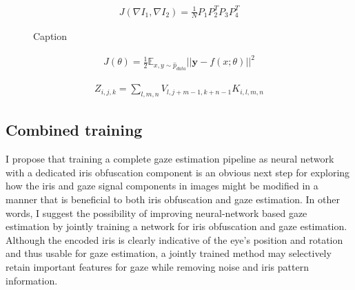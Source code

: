 \begin{align}
    J(\nabla I_1, \nabla I_2) = \frac{1}{N}P_1P_2^TP_3P_4^T
\end{align}

\begin{figure}
    \centering
    \caption{Caption}
    \label{fig:my_label}
\end{figure}


\begin{align}
    J(\theta) = \frac{1}{2}\mathbb{E}_{x,y\sim \hat{p}_{data}} ||\mathbf{y}-f(x;\theta)||^2
\end{align}

\begin{align}
    Z_{i,j,k} = \sum_{l,m,n} V_{l,j+m-1, k+n-1}K_{i,l,m,n}
\end{align}



\subsection{Combined training}
I propose that training a complete gaze estimation pipeline as neural network with a dedicated iris obfuscation component is an obvious next step for exploring how the iris and gaze signal components in images might be modified in a manner that is beneficial to both iris obfuscation and gaze estimation. In other words, I suggest the possibility of improving neural-network based gaze estimation by jointly training a network for iris obfuscation and gaze estimation. Although the encoded iris is clearly indicative of the eye's position and rotation and thus usable for gaze estimation, a jointly trained method may selectively retain important features for gaze while removing noise and iris pattern information.






